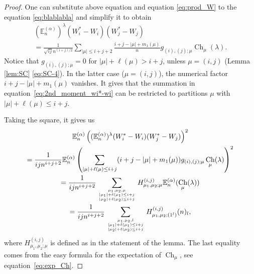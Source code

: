 \documentclass[11pt]{amsart}
\theoremstyle{plain}
\theoremstyle{remark}
\newcommand{\esper}{\mathbb{E}}
\DeclareMathOperator{\Ch}{Ch}
\begin{document}
\begin{proof}
One can substitute above equation and equation \eqref{eq:prod_W} to the equation \eqref{eq:blablabla} and
simplify it to obtain
\begin{multline}
    \label{eq:2nd_moment_wi*-wi}
(\esper_n^{(\alpha)})^\lambda(W_i^* - W_i)(W_j^* - W_j) \\
= \frac{1}{\sqrt{ij} n^{(i+j)/2}} 
\sum_{|\mu| \le i+j+2} \frac{i+j-|\mu|+m_1(\mu)}{n} g_{(i),(j); \mu} \Ch_\mu(\lambda).
\end{multline}
Notice that $g_{(i),(j); \mu}=0$ for $|\mu|+\ell(\mu) > i+j$, unless $\mu=(i,j)$
(Lemma \ref{lem:SC} \eqref{eq:SC-4}).
In the latter case ($\mu=(i,j)$), 
the numerical factor $i+j-|\mu|+m_1(\mu)$ vanishes.
It gives that the summation in equation~\eqref{eq:2nd_moment_wi*-wi} can be restricted
to partitions $\mu$ with $|\mu|+\ell(\mu) \le i+j$.

Taking the square, it gives us
\begin{multline}
\esper_n^{(\alpha)}\left((\esper_n^{(\alpha)})^\lambda(W_i^* - W_i)(W_j^* - W_j) \right)^2 \\
= \frac{1}{ij n^{i+j+2}}\esper_n^{(\alpha)}\left( \sum_{|\mu|+\ell(\mu) \le i+j} (i+j-|\mu|+m_1(\mu)) g_{(i),(j); \mu} \Ch_\mu(\lambda)\right)^2 \\
= \frac{1}{ij n^{i+j+2}}
\sum_{\mu_1, \mu_2, \mu \atop 
{\tiny |\mu_1|+\ell(\mu_1) \le i+j \atop |\mu_2|+\ell(\mu_2) \le i+j} }
H^{(i,j)}_{\mu_1, \mu_2; \mu}\esper_n^{(\alpha)}(\Ch_\mu(\lambda)) \\
= \frac{1}{ij n^{i+j+2}} \sum_{\mu_1, \mu_2, l\atop                   
{\tiny |\mu_1|+\ell(\mu_1) \le i+j \atop |\mu_2|+\ell(\mu_2) \le i+j} }
H^{(i,j)}_{\mu_1, \mu_2; (1^l)} (n)_l,
\end{multline}
where $H^{(i,j)}_{\mu_1, \mu_2; \mu}$ is defined as in the statement 
of the lemma. 
The last equality comes from the easy formula for the expectation of $\Ch_\mu$,
see equation~\eqref{eq:exp_Ch}.


\end{proof}
\end{document}
